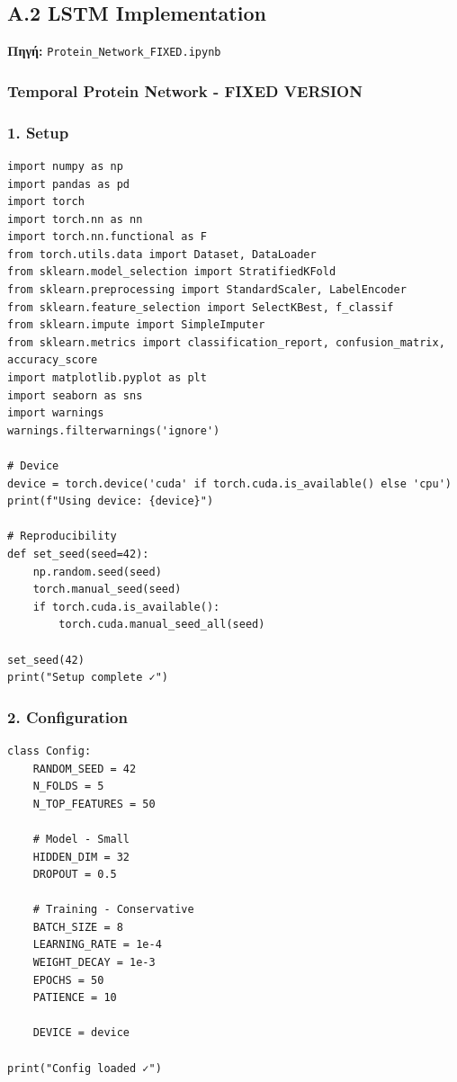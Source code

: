\subsection{A.2 LSTM Implementation}
 
\noindent \textbf{Πηγή:} \texttt{Protein\_Network\_FIXED.ipynb}
 
 
\subsubsection*{Temporal Protein Network - FIXED VERSION}
 
\subsubsection*{1. Setup}
 
\begin{lstlisting}
import numpy as np
import pandas as pd
import torch
import torch.nn as nn
import torch.nn.functional as F
from torch.utils.data import Dataset, DataLoader
from sklearn.model_selection import StratifiedKFold
from sklearn.preprocessing import StandardScaler, LabelEncoder
from sklearn.feature_selection import SelectKBest, f_classif
from sklearn.impute import SimpleImputer
from sklearn.metrics import classification_report, confusion_matrix, accuracy_score
import matplotlib.pyplot as plt
import seaborn as sns
import warnings
warnings.filterwarnings('ignore')
 
# Device
device = torch.device('cuda' if torch.cuda.is_available() else 'cpu')
print(f"Using device: {device}")
 
# Reproducibility
def set_seed(seed=42):
    np.random.seed(seed)
    torch.manual_seed(seed)
    if torch.cuda.is_available():
        torch.cuda.manual_seed_all(seed)
 
set_seed(42)
print("Setup complete ✓")
\end{lstlisting}
 
\subsubsection*{2. Configuration}
 
\begin{lstlisting}
class Config:
    RANDOM_SEED = 42
    N_FOLDS = 5
    N_TOP_FEATURES = 50
 
    # Model - Small
    HIDDEN_DIM = 32
    DROPOUT = 0.5
 
    # Training - Conservative
    BATCH_SIZE = 8
    LEARNING_RATE = 1e-4
    WEIGHT_DECAY = 1e-3
    EPOCHS = 50
    PATIENCE = 10
 
    DEVICE = device
 
print("Config loaded ✓")
\end{lstlisting}
 
